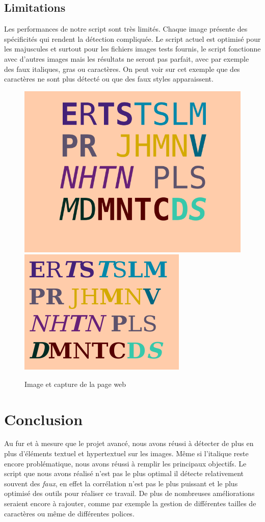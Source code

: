 \documentclass[a4paper,12pt,titlepage]{report}
\begin{document}
	\subsection{Limitations}
	Les performances de notre script sont très limités. Chaque image présente des spécificités qui rendent la détection compliquée. Le script actuel est optimisé pour les majuscules et surtout pour les fichiers images tests fournis, le script fonctionne avec d'autres images mais les résultats ne seront pas parfait, avec par exemple des faux italiques, gras ou caractères. 
	On peut voir sur cet exemple que des caractères ne sont plus détecté ou que des faux styles apparaissent.
	\begin{figure}[!h]
	\centering
		\includegraphics[height=0.25\textwidth]{../illus/CRASH.png}
		\includegraphics[height=0.25\textwidth]{../illus/fail.png}
		\caption{Image et capture de la page web}
	\end{figure}
	\section{Conclusion}
	Au fur et à mesure que le projet avancé, nous avons réussi à détecter de plus en plus d'éléments textuel et hypertextuel sur les images. Même si l'italique reste encore problématique, nous avons réussi à remplir les principaux objectifs.
	Le script que nous avons réalisé n'est pas le plus optimal il détecte relativement souvent des \textit{faux}, en effet la corrélation n'est pas le plus puissant et le plus optimisé des outils pour réaliser ce travail.
	De plus de nombreuses améliorations seraient encore à rajouter, comme par exemple la gestion de différentes tailles de caractères ou même de différentes polices.
	\listoffigures
	
	\lstlistoflistings
\end{document}
